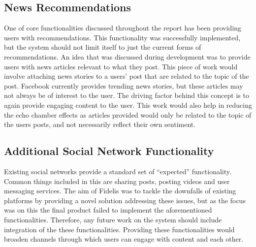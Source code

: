 \subsection{News Recommendations}
One of core functionalities discussed throughout the report has been providing users with recommendations. This functionality was successfully implemented, but the system should not limit itself to just the current forms of recommendations. An idea that was discussed during development was to provide users with news articles relevant to what they post.
This piece of work would involve attaching news stories to a users' post that are related to the topic of the post. Facebook currently provides trending news stories, but these articles may not always be of interest to the user. The driving factor behind this concept is to again provide engaging content to the user. This work would also help in reducing the echo chamber effects as articles provided would only be related to the topic of the users posts, and not necessarily reflect their own sentiment.

\subsection{Additional Social Network Functionality}
Existing social networks provide a standard set of ``expected'' functionality. Common things included in this are sharing posts, posting videos and user messaging services. The aim of Fidelis was to tackle the downfalls of existing platforms by providing a novel solution addressing these issues, but as the focus was on this the final product failed to implement the aforementioned functionalities. Therefore, any future work on the system should include integration of the these functionalities. Providing these functionalities would broaden channels through which users can engage with content and each other.